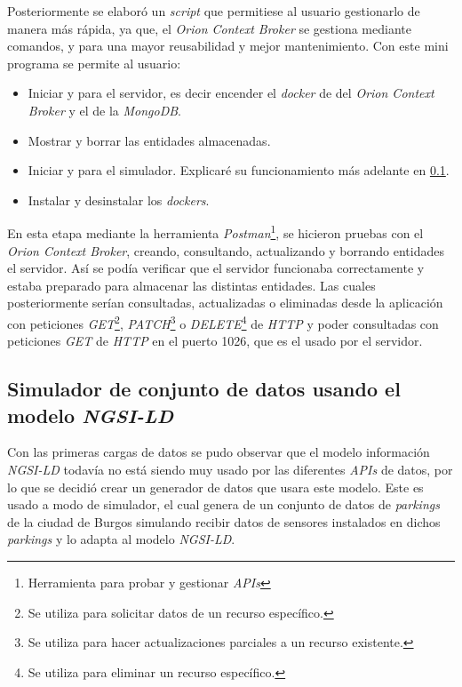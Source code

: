 Posteriormente se elaboró un \textit{script} que permitiese al usuario gestionarlo de manera más rápida, ya que, el \textit{Orion Context Broker} se gestiona mediante comandos, y para una mayor reusabilidad y mejor mantenimiento.
Con este mini programa se permite al usuario:
\begin{itemize}
    \item Iniciar y para el servidor, es decir encender el \textit{docker} de del \textit{Orion Context Broker} y el de la \textit{MongoDB}.
    \item Mostrar y borrar las entidades almacenadas.
    \item Iniciar y para el simulador. Explicaré su funcionamiento más adelante en \ref{simulador}.
    \item Instalar y desinstalar los \textit{dockers}.
\end{itemize}


En esta etapa mediante la herramienta \textit{Postman}\footnote{Herramienta para probar y gestionar \textit{APIs}}, se hicieron pruebas con el \textit{Orion Context Broker}, creando, consultando, actualizando y borrando entidades el servidor. Así se podía verificar que el servidor funcionaba correctamente y estaba preparado para almacenar las distintas entidades.
Las cuales posteriormente serían consultadas, actualizadas o eliminadas desde la aplicación con peticiones \textit{GET}\footnote{Se utiliza para solicitar datos de un recurso específico.}, \textit{PATCH}\footnote{Se utiliza para hacer actualizaciones parciales a un recurso existente.} o \textit{DELETE}\footnote{Se utiliza para eliminar un recurso específico.} de \textit{HTTP} y poder consultadas con peticiones \textit{GET} de \textit{HTTP} en el puerto 1026, que es el usado por el servidor.
\label{fig:post-postman}

\subsection{Simulador de conjunto de datos usando el modelo \textit{NGSI-LD}}\label{simulador}

Con las primeras cargas de datos se pudo observar que el modelo información \textit{NGSI-LD} todavía no está siendo muy usado por las diferentes \textit{APIs} de datos, por lo que se decidió crear un generador de datos que usara este modelo. Este es usado a modo de simulador, el cual genera de un conjunto de datos de \textit{parkings} de la ciudad de Burgos simulando recibir datos de sensores instalados en dichos \textit{parkings} y lo adapta al modelo \textit{NGSI-LD}. 

